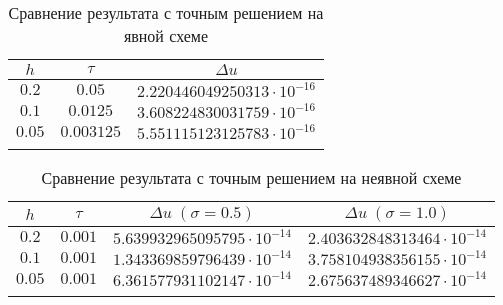 \begin{table}[h]
  \centering
  \caption{Сравнение результата с точным решением на явной схеме}
  \begin{tabular}{ccc}
    \toprule
    $ h $ &
    $ \tau $ &
    $ \Delta u $ \\
    \midrule
    $ 0.2 $ & $ 0.05 $ & $ 2.220446049250313 \cdot 10^{-16} $ \\
    \arrayrulecolor{black!40}
    \midrule
    $ 0.1 $ & $ 0.0125 $ & $ 3.608224830031759 \cdot 10^{-16} $ \\
    \midrule
    $ 0.05 $ & $ 0.003125 $ & $ 5.551115123125783 \cdot 10^{-16} $ \\
    \arrayrulecolor{black}
    \bottomrule
  \end{tabular}
\end{table}

\begin{table}[h]
  \centering
  \caption{Сравнение результата с точным решением на неявной схеме}
  \begin{tabular}{cccc}
    \toprule
    $ h $ &
    $ \tau $ &
    $ \Delta u \; (\sigma = 0.5) $ &
    $ \Delta u \; (\sigma = 1.0) $ \\
    \midrule
    $ 0.2 $ & $ 0.001 $ & $ 5.639932965095795 \cdot 10^{-14} $ & $ 2.403632848313464 \cdot 10^{-14} $ \\
    \arrayrulecolor{black!40}
    \midrule
    $ 0.1 $ & $ 0.001 $ & $ 1.343369859796439 \cdot 10^{-14} $ & $ 3.758104938356155 \cdot 10^{-14} $ \\
    \midrule
    $ 0.05 $ & $ 0.001 $ & $ 6.361577931102147 \cdot 10^{-14} $ & $ 2.675637489346627 \cdot 10^{-14} $ \\
    \arrayrulecolor{black}
    \bottomrule
  \end{tabular}
\end{table}


